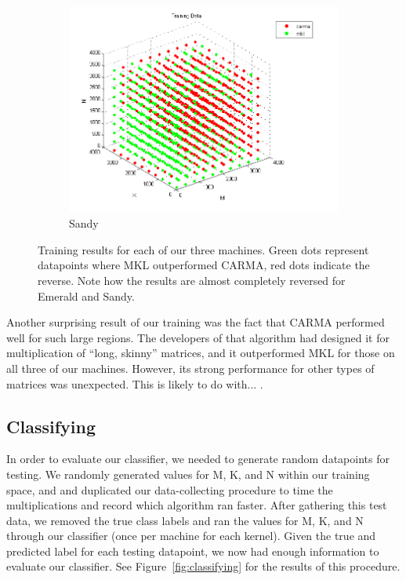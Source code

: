 \begin{figure}[t]
        \begin{subfigure}[t]{0.33\textwidth}
            \includegraphics[width=\textwidth]{figures/sandy_train.png}
            \caption{Sandy}
            \label{f:train_sandy}
        \end{subfigure}
        \caption{Training results for each of our three machines. Green dots represent datapoints where MKL outperformed CARMA, red dots indicate the reverse. Note how the results are almost completely reversed for Emerald and Sandy.}
    \label{fig:training}
\end{figure}

Another surprising result of our training was the fact that CARMA performed well for such large regions.
The developers of that algorithm had designed it for multiplication of ``long, skinny'' matrices, and it outperformed MKL for those on all three of our machines.
However, its strong performance for other types of matrices was unexpected.
This is likely to do with... .

\subsection{Classifying}
In order to evaluate our classifier, we needed to generate random datapoints for testing.
We randomly generated values for M, K, and N within our training space, and and duplicated our data-collecting procedure to time the multiplications and record which algorithm ran faster.
After gathering this test data, we removed the true class labels and ran the values for M, K, and N through our classifier (once per machine for each kernel).
Given the true and predicted label for each testing datapoint, we now had enough information to evaluate our classifier.
See Figure~\ref{fig:classifying} for the results of this procedure.

